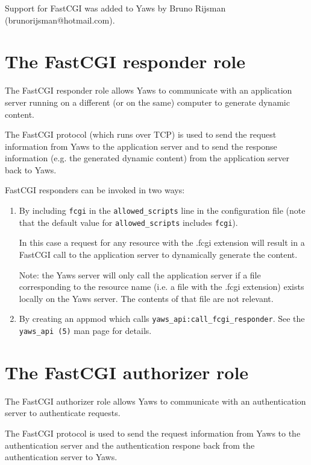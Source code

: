 \documentclass[11pt,oneside,english]{book}
\begin{document}
Support for FastCGI was added to Yaws by Bruno Rijsman
(brunorijsman@hotmail.com).

\section{The FastCGI responder role}

The FastCGI responder role allows Yaws to communicate with an
application server running on a different (or on the same) computer
to generate dynamic content.

The FastCGI protocol (which runs over TCP) is used to send the request
information from Yaws to the application server and to send the
response information (e.g. the generated dynamic content) from
the application server back to Yaws.

FastCGI responders can be invoked in two ways:

\begin{enumerate}

\item
By including \verb+fcgi+ in the \verb+allowed_scripts+ line
in the configuration file (note that the default value for
\verb+allowed_scripts+ includes \verb+fcgi+).

In this case a request for any resource with the
.fcgi extension will result in a FastCGI call to the application
server to dynamically generate the content.

Note: the Yaws server
will only call the application server if a file corresponding to
the resource name (i.e. a file with the .fcgi extension)
exists locally on the Yaws server. The contents of that
file are not relevant.

\item
By creating an appmod which calls \verb+yaws_api:call_fcgi_responder+.
See the \verb+yaws_api (5)+ man page for details.

\end{enumerate}

\section{The FastCGI authorizer role}

The FastCGI authorizer role allows Yaws to communicate with an
authentication server to authenticate requests.

The FastCGI protocol is used to send the request
information from Yaws to the authentication server and the
authentication respone back from the authentication server to
Yaws.
\end{document}
